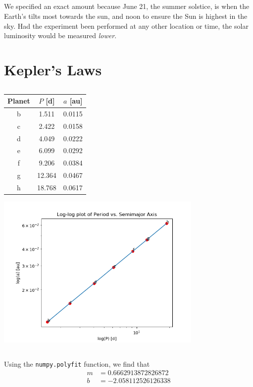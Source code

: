 \documentclass{article}
\begin{document}
\subsection{}

We specified an exact amount because June 21, the summer solstice, is when the Earth's tilts most towards the sun, and noon to ensure the Sun is highest in the sky.
Had the experiment been performed at any other location or time, the solar luminosity would be measured \emph{lower}.

\section{Kepler's Laws}



\subsection{}

\begin{center}
\begin{tabular}{||c|c|c||}
    \hline
    \textbf{Planet} & \(P\) [\si{\day}] & \(a\) [\si{\astronomicalunit}] \\
    \hline
    b & 1.511 & 0.0115 \\
    c & 2.422 & 0.0158 \\
    d & 4.049 & 0.0222 \\
    e & 6.099 & 0.0292 \\
    f & 9.206 & 0.0384 \\
    g & 12.364 & 0.0467 \\
    h & 18.768 & 0.0617 \\
    \hline
\end{tabular}
\end{center}

\begin{center}
    \includegraphics[width=0.75\textwidth]{prob5-a.png}
\end{center}

\subsection{}

Using the \lstinline|numpy.polyfit| function, we find that
\begin{align}
    m &= 0.6662913872826872 \\
    b &= -2.058112526126338
\end{align}
\end{document}
